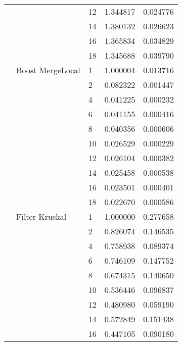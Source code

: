 \begin{tabular}{lllrr}
                      &                     & 12 &  1.344817 &  0.024776 \\
                      &                     & 14 &  1.380132 &  0.026623 \\
                      &                     & 16 &  1.365834 &  0.034829 \\
                      &                     & 18 &  1.345688 &  0.039790 \\
                      & Boost MergeLocal & 1  &  1.000004 &  0.013716 \\
                      &                     & 2  &  0.082322 &  0.001447 \\
                      &                     & 4  &  0.041225 &  0.000232 \\
                      &                     & 6  &  0.041155 &  0.000416 \\
                      &                     & 8  &  0.040356 &  0.000606 \\
                      &                     & 10 &  0.026529 &  0.000229 \\
                      &                     & 12 &  0.026104 &  0.000382 \\
                      &                     & 14 &  0.025458 &  0.000538 \\
                      &                     & 16 &  0.023501 &  0.000401 \\
                      &                     & 18 &  0.022670 &  0.000586 \\
                      & Filter Kruskal & 1  &  1.000000 &  0.277658 \\
                      &                     & 2  &  0.826074 &  0.146535 \\
                      &                     & 4  &  0.758938 &  0.089374 \\
                      &                     & 6  &  0.746109 &  0.147752 \\
                      &                     & 8  &  0.674315 &  0.140650 \\
                      &                     & 10 &  0.536446 &  0.096837 \\
                      &                     & 12 &  0.480980 &  0.059190 \\
                      &                     & 14 &  0.572849 &  0.151438 \\
                      &                     & 16 &  0.447105 &  0.090180 \\

\end{tabular}
